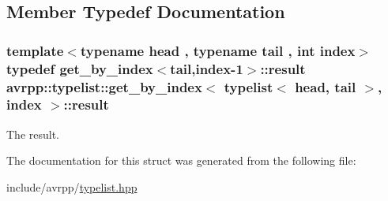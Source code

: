 \subsection{Member Typedef Documentation}
\hypertarget{structavrpp_1_1typelist_1_1get__by__index_3_01typelist_3_01head_00_01tail_01_4_00_01index_01_4_ad6017322d8f1e7d9ab87f74756984f0e}{
\subsubsection[{result}]{\setlength{\rightskip}{0pt plus 5cm}template$<$typename head , typename tail , int index$>$ typedef get\_\-by\_\-index$<$tail,index-\/1$>$::{\bf result} avrpp::typelist::get\_\-by\_\-index$<$ {\bf typelist}$<$ head, tail $>$, index $>$::{\bf result}}}
\label{structavrpp_1_1typelist_1_1get__by__index_3_01typelist_3_01head_00_01tail_01_4_00_01index_01_4_ad6017322d8f1e7d9ab87f74756984f0e}


The result. 



The documentation for this struct was generated from the following file:\begin{DoxyCompactItemize}
\item 
include/avrpp/\hyperlink{typelist_8hpp}{typelist.hpp}\end{DoxyCompactItemize}
